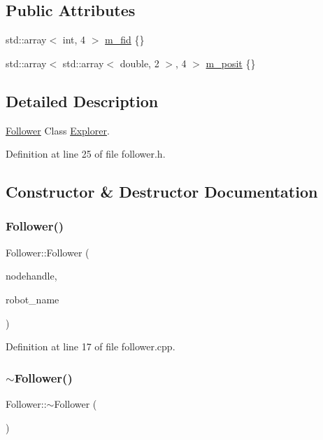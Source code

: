 \subsection*{Public Attributes}
\begin{DoxyCompactItemize}
\item 
std\+::array$<$ int, 4 $>$ \hyperlink{class_follower_a350054bbd7659d493cccc4b4ad9bc460}{m\+\_\+fid} \{\}
\item 
std\+::array$<$ std\+::array$<$ double, 2 $>$, 4 $>$ \hyperlink{class_follower_a6d4e1ebbe79cc8af601d53cba7aeb30a}{m\+\_\+posit} \{\}
\end{DoxyCompactItemize}


\subsection{Detailed Description}
\hyperlink{class_follower}{Follower} Class \hyperlink{class_explorer}{Explorer}. 

Definition at line 25 of file follower.\+h.



\subsection{Constructor \& Destructor Documentation}
\mbox{\label{class_follower_a6870e654b7cc901944ead12870a6b107}} 
\subsubsection{\texorpdfstring{Follower()}{Follower()}}
{\footnotesize\ttfamily Follower\+::\+Follower (\begin{DoxyParamCaption}\item[{ros\+::\+Node\+Handle $\ast$}]{nodehandle,  }\item[{const std\+::string \&}]{robot\+\_\+name }\end{DoxyParamCaption})}



Definition at line 17 of file follower.\+cpp.

\mbox{\label{class_follower_a1dd55289af5ded7a57a2874c5477c33d}} 
\subsubsection{\texorpdfstring{$\sim$\+Follower()}{~Follower()}}
{\footnotesize\ttfamily Follower\+::$\sim$\+Follower (\begin{DoxyParamCaption}{ }\end{DoxyParamCaption})\hspace{0.3cm}{\ttfamily [inline]}}



